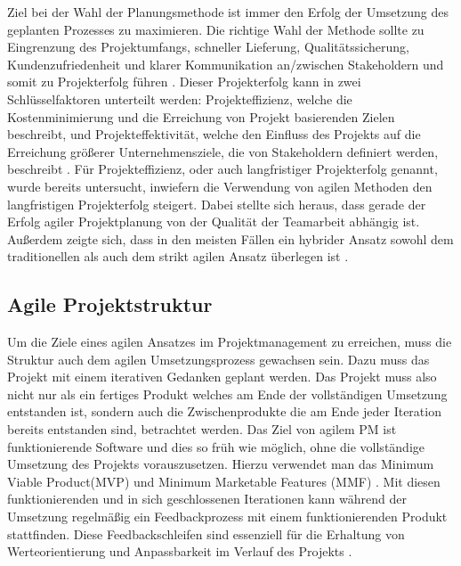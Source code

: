 Ziel bei der Wahl der Planungsmethode ist immer den Erfolg der Umsetzung des geplanten Prozesses zu maximieren.
Die richtige Wahl der Methode sollte zu Eingrenzung des Projektumfangs, schneller Lieferung, Qualitätssicherung, Kundenzufriedenheit und klarer Kommunikation an/zwischen Stakeholdern und somit zu Projekterfolg führen \cite{systemsApproachToPlanningSchedulingAndControlling}.
Dieser Projekterfolg kann in zwei Schlüsselfaktoren unterteilt werden: Projekteffizienz, welche die Kostenminimierung und die Erreichung von Projekt basierenden Zielen beschreibt, und Projekteffektivität, welche den Einfluss des Projekts auf die Erreichung größerer Unternehmensziele, die von Stakeholdern definiert werden, beschreibt \cite{relationshipBetweenProjectSuccessAndProjectEfficiency}.
Für Projekteffizienz, oder auch langfristiger Projekterfolg genannt, wurde bereits untersucht, inwiefern die Verwendung von agilen Methoden den langfristigen Projekterfolg steigert. Dabei stellte sich heraus, dass gerade der Erfolg agiler Projektplanung von der Qualität der Teamarbeit abhängig ist.
Außerdem zeigte sich, dass in den meisten Fällen ein hybrider Ansatz sowohl dem traditionellen als auch dem strikt agilen Ansatz überlegen ist \cite{traditionalAndAgileOnProjectSuccess}.

\subsection{Agile Projektstruktur}
Um die Ziele eines agilen Ansatzes im Projektmanagement zu erreichen, muss die Struktur auch dem agilen Umsetzungsprozess gewachsen sein. Dazu muss das Projekt mit einem iterativen Gedanken geplant werden. Das Projekt muss also nicht nur als ein fertiges Produkt welches am Ende der vollständigen Umsetzung entstanden ist, sondern auch die Zwischenprodukte die am Ende jeder Iteration bereits entstanden sind, betrachtet werden. Das Ziel von agilem PM ist funktionierende Software und dies so früh wie möglich, ohne die vollständige Umsetzung des Projekts vorauszusetzen. Hierzu verwendet man das Minimum Viable Product(MVP) und Minimum Marketable Features (MMF) \cite{agilesProjektmanagementImBerufsalltagMVPundMMF}.  Mit diesen funktionierenden und in sich geschlossenen Iterationen kann während der Umsetzung regelmäßig ein Feedbackprozess mit einem funktionierenden Produkt stattfinden. Diese Feedbackschleifen sind essenziell für die Erhaltung von Werteorientierung und Anpassbarkeit im Verlauf des Projekts \cite{AMORIM2021101496}.

